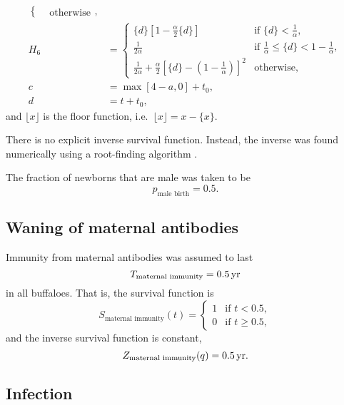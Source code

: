 \documentclass{jpmarticle}
\begin{document}
\begin{align}
\begin{cases}
    & \text{otherwise}
  \end{cases},
  \\
  H_6 &=
  \begin{cases}
    \{d\} \left[1 - \frac{\alpha}{2} \{d\}\right]
    & \text{if $\{d\} < \frac{1}{\alpha}$},
    \\
    \frac{1}{2 \alpha}
    & \text{if $\frac{1}{\alpha} \leq \{d\} <
      1 - \frac{1}{\alpha}$},
    \\
    \frac{1}{2 \alpha}
    + \frac{\alpha}{2}
    \left[\{d\} - \left(1 - \frac{1}{\alpha}\right)\right]^2
    & \text{otherwise},
  \end{cases}
  \\
  c &= \max[4 - a, 0] + t_0,
  \\
  d &= t + t_0,
\end{align}
and $\lfloor x \rfloor$ is the floor function,
i.e.~$\lfloor x \rfloor = x - \{x\}$.

There is no explicit inverse survival function.  Instead, the inverse
was found numerically using a root-finding algorithm \citep{scipy}.

The fraction of newborns that are male was taken to be
\begin{equation}
  p_{\text{male birth}} = 0.5.
\end{equation}


\subsection{Waning of maternal antibodies}

Immunity from maternal antibodies was assumed to last
\begin{equation}
  T_{\text{maternal immunity}} = \unit[0.5]{yr}
\end{equation}
in all buffaloes.  That is, the survival function is
\begin{equation}
  S_{\text{maternal immunity}}(t) =
  \begin{cases}
    1 & \text{if $t < 0.5$},
    \\
    0 & \text{if $t \geq 0.5$},
  \end{cases}
\end{equation}
and the inverse survival function is constant,
\begin{equation}
  Z_{\text{maternal immunity}}(q) = \unit[0.5]{yr}.
\end{equation}


\subsection{Infection}
\end{document}
